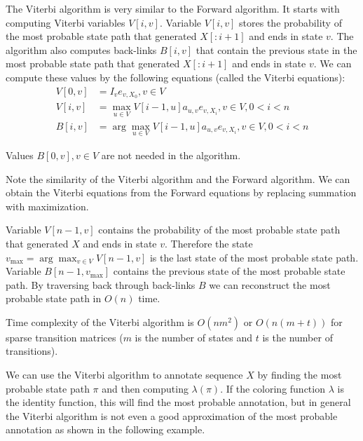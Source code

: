 The Viterbi algorithm is very similar to the  Forward algorithm. It starts with computing
Viterbi variables $V[i,v]$. Variable $V[i,v]$ stores the probability of the most probable 
state path that generated $X[:i+1]$ and ends in state $v$. The algorithm
also computes back-links $B[i,v]$ that contain the previous state in the most
probable state path that generated $X[:i+1]$ and ends in state $v$. We can
compute these values by the following equations (called the Viterbi equations):
\begin{align}
V[0,v] &= I_{v}e_{v,X_0}, v\in V\\
V[i,v] &= \max_{u\in V} V[i-1,u]a_{u,v}e_{v,X_i}, v\in V,0<i<n\\
B[i,v] &= \arg\max_{u\in V} V[i-1,u]a_{u,v}e_{v,X_i}, v\in V,0<i<n
\end{align}
\begin{note}
Values $B[0,v],v\in V$ are not needed in the algorithm.

Note the similarity of the Viterbi algorithm and the Forward algorithm.
We can obtain the Viterbi equations from the Forward equations by replacing
summation with
maximization.
\end{note}


Variable $V[n-1,v]$ contains the probability of the most probable state path
that generated $X$ and ends in state $v$. Therefore the state $v_{\max} =
\arg\max_{v\in V}V[n-1,v]$ is the last state of the most probable state path.
Variable $B[n-1,v_{\max}]$ contains the previous state of the most probable
state path. By traversing back through back-links $B$ we can reconstruct the most
probable state path in $O(n)$ time.

Time complexity of the Viterbi algorithm is $O(nm^2)$ or $O(n(m+t))$ for sparse
transition matrices ($m$ is the number of states and $t$ is the number of
transitions).


We can use the Viterbi algorithm to annotate sequence $X$ by finding the most
probable state path $\pi$ and then computing $\lambda(\pi)$. If the  coloring
function $\lambda$ is the identity function, this will find the most probable
annotation, but in general the Viterbi algorithm is not even a good approximation of
the most probable annotation as shown in the following example.

